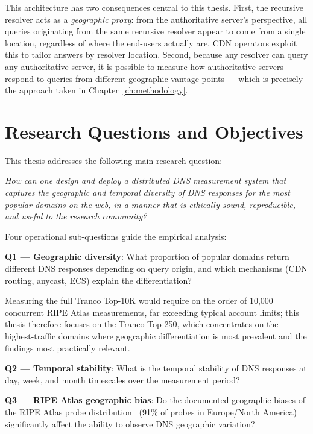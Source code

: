 This architecture has two consequences central to this thesis. First, the recursive resolver acts as a \textit{geographic proxy}: from the authoritative server's perspective, all queries originating from the same recursive resolver appear to come from a single location, regardless of where the end-users actually are. \ac{CDN} operators exploit this to tailor answers by resolver location. Second, because any resolver can query any authoritative server, it is possible to measure how authoritative servers respond to queries from different geographic vantage points — which is precisely the approach taken in Chapter~\ref{ch:methodology}.


\bigskip
\section{Research Questions and Objectives}
\label{sec:1.3}

This thesis addresses the following main research question:

\textit{How can one design and deploy a distributed \ac{DNS} measurement system that captures the geographic and temporal diversity of \ac{DNS} responses for the most popular domains on the web, in a manner that is ethically sound, reproducible, and useful to the research community?}

Four operational sub-questions guide the empirical analysis:

\textbf{Q1 — Geographic diversity}: What proportion of popular domains return different \ac{DNS} responses depending on query origin, and which mechanisms (\ac{CDN} routing, anycast, \ac{ECS}) explain the differentiation? 

Measuring the full Tranco Top-10K would require on the order of 10,000 concurrent RIPE Atlas measurements, far exceeding typical account limits; this thesis therefore focuses on the Tranco Top-250, which concentrates on the highest-traffic domains where geographic differentiation is most prevalent and the findings most practically relevant.


\textbf{Q2 — Temporal stability}: What is the temporal stability of \ac{DNS} responses at day, week, and month timescales over the measurement period?

\textbf{Q3 — RIPE Atlas geographic bias}: Do the documented geographic biases of the RIPE Atlas probe distribution~\cite{Bajpai2017} (91\% of probes in Europe/North America) significantly affect the ability to observe \ac{DNS} geographic variation?

